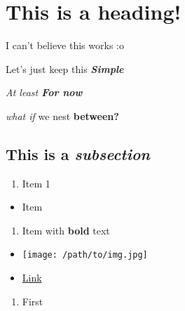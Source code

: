\documentclass{article}
\begin{document}
    \pagestyle{empty}

\section{This is a heading!}


I can't believe this works :o


Let's just keep this \textit{\textbf{Simple}}


\textit{At least \textbf{For now}}


\textit{what if} we nest \textbf{between?}


\subsection{This is a \textit{subsection}}



\begin{enumerate}
    \item Item 1
\end{enumerate}

\begin{itemize}
    \item Item
\end{itemize}

\begin{enumerate}
    \item Item with \textbf{bold} text
\end{enumerate}

\begin{itemize}
    \item \texttt{[image: /path/to/img.jpg]}
    \item \href{http://example.com}{Link}
\end{itemize}



\begin{enumerate}
    \item First
\end{enumerate}
\end{document}
